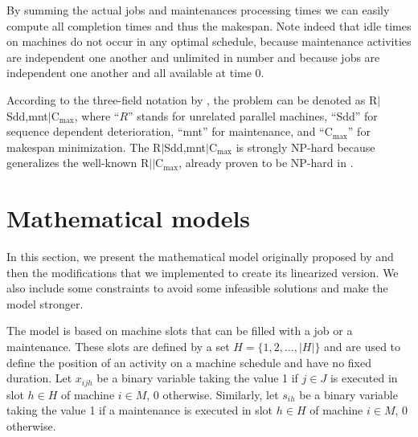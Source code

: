\documentclass[a4paper,11pt]{article}
\begin{document}
By summing the actual jobs and maintenances processing times we can easily compute all completion times and thus the makespan. Note indeed that idle times on machines do not occur in any optimal schedule, because maintenance activities are independent one another and unlimited in number and  because jobs are independent one another and all available at time 0. 

According to the three-field notation by \cite{GLLR79}, the problem can be denoted as R$|$Sdd,mnt$|$C$_{\max}$, where ``$R$'' stands for unrelated parallel machines, ``Sdd'' for sequence dependent deterioration, ``mnt'' for maintenance, and ``C$_{\max}$'' for makespan minimization. The R$|$Sdd,mnt$|$C$_{\max}$ is strongly NP-hard because generalizes the well-known R$|$$|$C$_{\max}$, already proven to be NP-hard in \cite{P16}.

\section{Mathematical models} \label{sec:model}

In this section, we present the mathematical model originally proposed by \citep{ruiz2017makespan} and then the modifications that we implemented to create its linearized version. We also include some constraints to avoid some infeasible solutions and make the model stronger.

The model is based on machine slots that can be filled with a job or a maintenance. These slots are defined by a set $H = \{1, 2, \dots, |H|\}$ and are used to define the position of an activity on a machine schedule and have no fixed duration. 
Let $x_{ijh}$ be a binary variable taking the value 1 if $j \in J$ is executed in slot $h \in H$ of machine $i \in M$, 0 otherwise. Similarly, let $s_{ih}$ be a binary variable taking the value 1 if a maintenance is executed in slot $h \in H$ of machine $i \in M$, 0 otherwise. 
\end{document}
